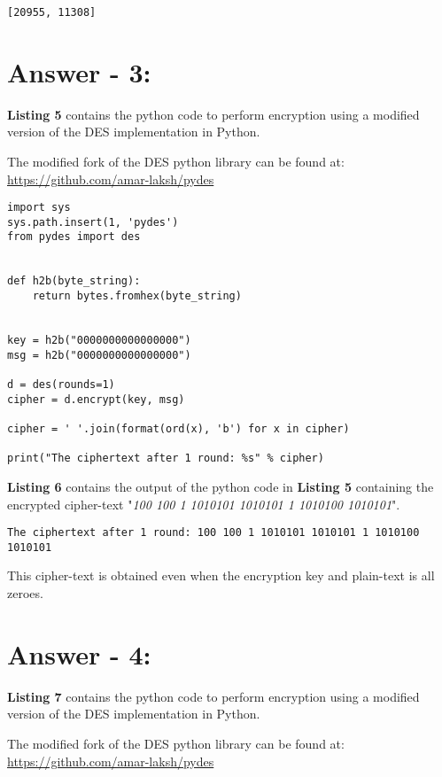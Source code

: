 \documentclass[10pt,a4paper,oneside]{article}
\begin{document}
\begin{lstlisting}
[20955, 11308]
\end{lstlisting}

\section*{Answer - 3:}

\textbf{Listing 5} contains the python code to perform encryption using a modified version of the DES implementation in Python.

The modified fork of the DES python library can be found at:\linebreak
\href{https://github.com/amar-laksh/pydes}{https://github.com/amar-laksh/pydes}

\begin{lstlisting}
import sys
sys.path.insert(1, 'pydes')
from pydes import des


def h2b(byte_string):
    return bytes.fromhex(byte_string)


key = h2b("0000000000000000")
msg = h2b("0000000000000000")

d = des(rounds=1)
cipher = d.encrypt(key, msg)

cipher = ' '.join(format(ord(x), 'b') for x in cipher)

print("The ciphertext after 1 round: %s" % cipher)
\end{lstlisting}
\textbf{Listing 6} contains the output of the python code in \textbf{Listing 5} containing the encrypted cipher-text "\textit{100 100 1 1010101 1010101 1 1010100 1010101}". 

\begin{lstlisting}
The ciphertext after 1 round: 100 100 1 1010101 1010101 1 1010100 1010101
\end{lstlisting}
This cipher-text is obtained even when the encryption key and plain-text is all zeroes.

\section*{Answer - 4:}

\textbf{Listing 7} contains the python code to perform encryption using a modified version of the DES implementation in Python.

The modified fork of the DES python library can be found at:\linebreak
\href{https://github.com/amar-laksh/pydes}{https://github.com/amar-laksh/pydes}
\end{document}

